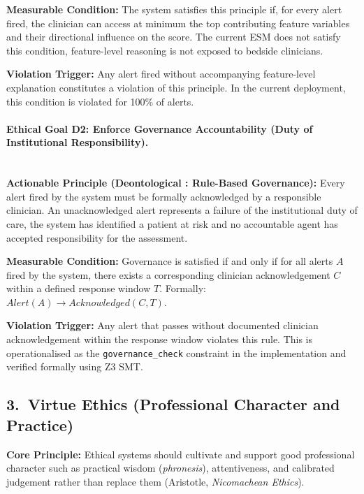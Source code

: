 \documentclass[]{UCD_CS_41820_Report}
\begin{document}
\medskip
\textbf{Measurable Condition:} The system satisfies this principle if, for every
alert fired, the clinician can access at minimum the top contributing feature
variables and their directional influence on the score. The current ESM does not
satisfy this condition, feature-level reasoning is not exposed to bedside
clinicians.\par

\medskip
\textbf{Violation Trigger:} Any alert fired without accompanying feature-level
explanation constitutes a violation of this principle. In the current deployment,
this condition is violated for 100\% of alerts.\par

\paragraph{Ethical Goal D2: Enforce Governance Accountability (Duty of Institutional Responsibility).}~\\

\textbf{Actionable Principle (Deontological : Rule-Based Governance):}
Every alert fired by the system must be formally acknowledged by a responsible
clinician. An unacknowledged alert represents a failure of the institutional duty
of care, the system has identified a patient at risk and no accountable agent has
accepted responsibility for the assessment.\par

\medskip
\textbf{Measurable Condition:} Governance is satisfied if and only if for all alerts
$A$ fired by the system, there exists a corresponding clinician acknowledgement $C$
within a defined response window $T$. Formally: $Alert(A) \rightarrow
Acknowledged(C, T)$.\par

\medskip
\textbf{Violation Trigger:} Any alert that passes without documented clinician
acknowledgement within the response window violates this rule. This is
operationalised as the \texttt{governance\_check} constraint in the implementation
and verified formally using Z3 SMT.\par

\subsection*{3.\ Virtue Ethics (Professional Character and Practice)}

\textbf{Core Principle:} Ethical systems should cultivate and support good
professional character such as practical wisdom (\textit{phronesis}),
attentiveness, and calibrated judgement rather than replace them (Aristotle,
\textit{Nicomachean Ethics}).
\end{document}
